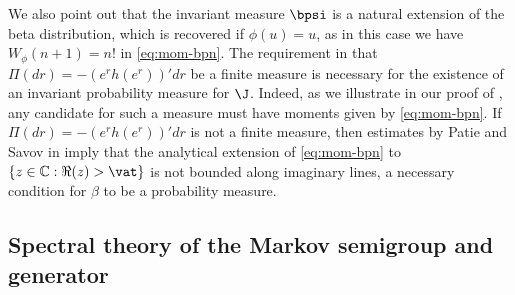 We also point out that the invariant measure $\bpsi$ is a natural extension of the beta distribution, which is recovered if $\phi(u) = u$, as in this case we have $W_\phi(n+1)=n!$ in \eqref{eq:mom-bpn}. The requirement in  that $\Pi(dr) = -(e^rh(e^r))'dr$ be a finite measure is necessary for the existence of an invariant probability measure for $\J$. Indeed, as we illustrate in our proof of , any candidate for such a measure must have moments given by \eqref{eq:mom-bpn}. If $\Pi(dr) = -(e^rh(e^r))'dr$ is not a finite measure, then estimates by Patie and Savov in \cite[Th.\,3.3]{Patie-Savov-Bern} imply that the analytical extension of \eqref{eq:mom-bpn} to $\{z \in \mathbb{C} : \Re(z) > \vat\}$ is not bounded along imaginary lines, a necessary condition for $\beta$ to be a probability measure.

\subsection{Spectral theory of the Markov semigroup and generator}

